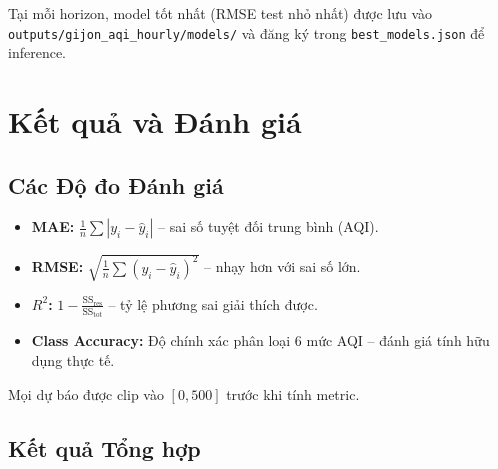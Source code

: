 \documentclass[12pt,a4paper]{report}
\begin{document}
Tại mỗi horizon, model tốt nhất (RMSE test nhỏ nhất) được lưu vào \texttt{outputs/gijon\_aqi\_hourly/models/} và đăng ký trong \texttt{best\_models.json} để inference.

\chapter{Kết quả và Đánh giá}

\section{Các Độ đo Đánh giá}

\begin{itemize}
  \item \textbf{MAE:} $\displaystyle\frac{1}{n}\sum|y_i - \hat{y}_i|$ -- sai số tuyệt đối trung bình (AQI).
  \item \textbf{RMSE:} $\displaystyle\sqrt{\frac{1}{n}\sum(y_i - \hat{y}_i)^2}$ -- nhạy hơn với sai số lớn.
  \item \textbf{$R^2$:} $\displaystyle 1 - \frac{\text{SS}_\text{res}}{\text{SS}_\text{tot}}$ -- tỷ lệ phương sai giải thích được.
  \item \textbf{Class Accuracy:} Độ chính xác phân loại 6 mức AQI -- đánh giá tính hữu dụng thực tế.
\end{itemize}

Mọi dự báo được clip vào $[0, 500]$ trước khi tính metric.

\section{Kết quả Tổng hợp}
\end{document}
